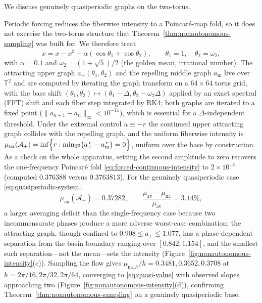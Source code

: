 \documentclass[pdflatex,sn-mathphys-num]{sn-jnl}
\numberwithin{equation}{section}
\theoremstyle{thmstyleone}%
\theoremstyle{definition}
\theoremstyle{remark}
\begin{document}
We discuss genuinely quasiperiodic graphs on the two-torus.

Periodic forcing reduces the fiberwise intensity to a Poincar\'e-map fold, so it does not exercise the two-torus structure that Theorem~\ref{thm:nonautonomous-sampling} was built for. We therefore treat
\begin{equation}
    \dot x=x-x^3+\alpha(\cos\theta_1+\cos\theta_2),\qquad
    \dot\theta_1=1,\quad \dot\theta_2=\omega_2,
    \label{eq:quasiperiodic-system}
\end{equation}
with $\alpha=0.1$ and $\omega_2=(1+\sqrt5)/2$ (the golden mean, irrational number). The attracting upper graph $a_+(\theta_1,\theta_2)$ and the repelling middle graph $a_{\mathrm m}$ live over $\mathbb T^2$ and are
computed by iterating the graph transform on a $64\times64$ torus grid, with the base shift $(\theta_1,\theta_2)\mapsto(\theta_1-\Delta,\theta_2-\omega_2 \Delta)$ applied by an exact spectral (FFT) shift and each fiber step integrated by RK4; both graphs are iterated to a fixed point ($\|a_{n+1}-a_n\|_\infty<10^{-11}$), which is essential for a $\Delta$-independent threshold. Under the extremal control $u\equiv-r$ the continued upper attracting graph collides with the repelling graph, and the uniform fiberwise intensity is
    $\mu_{\mathrm{na}}(\mathcal A_+)
    =\inf\Bigl\{r:\min_{\mathbb T^2}\bigl(a_+^{\,r}-a_{\mathrm m}^{\,r}\bigr)=0\Bigr\}$,
uniform over the base by construction. As a check on the whole apparatus, setting the second amplitude to zero recovers the one-frequency Poincar\'e fold \eqref{eq:forced-continuous-intensity} to $2\times10^{-5}$ (computed $0.376388$ versus $0.3763813$). For the genuinely quasiperiodic case \eqref{eq:quasiperiodic-system},
\begin{equation}
    \mu_{\mathrm{na}}(\mathcal A_+)=0.37282,
    \qquad
    \frac{\mu_{\mathrm{av}}-\mu_{\mathrm{na}}}{\mu_{\mathrm{av}}}=3.14\%,
    \label{eq:quasi-value}
\end{equation}
a larger averaging deficit than the single-frequency case because two incommensurate phases produce a more adverse worst-case combination; the attracting graph, though confined to $0.908\le a_+\le1.077$, has a
phase-dependent separation from the basin boundary ranging over $[0.842,1.154]$, and the smallest such separation---not the mean---sets the intensity (Figure~\ref{fig:nonautonomous-intensity}(c)). Sampling the flow gives $\mu_{\mathrm{na},h}/h=0.3481,0.3652,0.3708$ at $h=2\pi/16,2\pi/32,2\pi/64$, converging to \eqref{eq:quasi-value} with observed slopes approaching two (Figure~\ref{fig:nonautonomous-intensity}(d)), confirming Theorem~\ref{thm:nonautonomous-sampling} on a genuinely quasiperiodic base.
\end{document}
